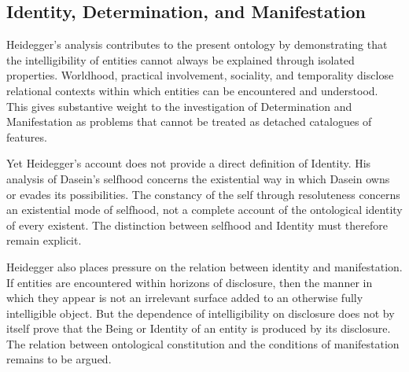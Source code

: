 
\subsection{Identity, Determination, and Manifestation}
\label{subsec:ch08-heidegger-comparison}

\label{para:VS.B01.P01.C08.S11.SS13.P001}

Heidegger's analysis contributes to the present
ontology by demonstrating that the intelligibility
of entities cannot always be explained through
isolated properties. Worldhood, practical
involvement, sociality, and temporality disclose
relational contexts within which entities can
be encountered and understood. This gives
substantive weight to the investigation of
Determination and Manifestation as problems
that cannot be treated as detached catalogues
of features.

\label{para:VS.B01.P01.C08.S11.SS13.P002}

Yet Heidegger's account does not provide a
direct definition of Identity. His analysis
of Dasein's selfhood concerns the existential
way in which Dasein owns or evades its
possibilities. The constancy of the self
through resoluteness concerns an existential
mode of selfhood, not a complete account
of the ontological identity of every existent.
The distinction between selfhood and Identity
must therefore remain explicit.

\label{para:VS.B01.P01.C08.S11.SS13.P003}

Heidegger also places pressure on the relation
between identity and manifestation. If entities
are encountered within horizons of disclosure,
then the manner in which they appear is not
an irrelevant surface added to an otherwise
fully intelligible object. But the dependence
of intelligibility on disclosure does not by
itself prove that the Being or Identity of an
entity is produced by its disclosure. The
relation between ontological constitution
and the conditions of manifestation remains
to be argued.
\cite{WrathallHeideggerSEP2025}

\label{para:VS.B01.P01.C08.S11.SS13.P004}


